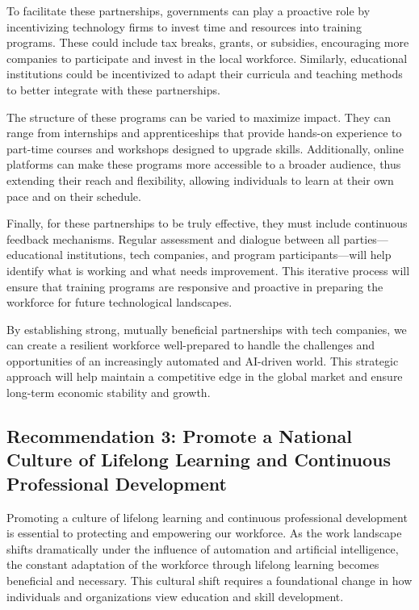 \documentclass[11pt]{article}
\begin{document}
To facilitate these partnerships, governments can play a proactive role by incentivizing technology firms to invest time and resources into training programs. These could include tax breaks, grants, or subsidies, encouraging more companies to participate and invest in the local workforce. Similarly, educational institutions could be incentivized to adapt their curricula and teaching methods to better integrate with these partnerships.

The structure of these programs can be varied to maximize impact. They can range from internships and apprenticeships that provide hands-on experience to part-time courses and workshops designed to upgrade skills. Additionally, online platforms can make these programs more accessible to a broader audience, thus extending their reach and flexibility, allowing individuals to learn at their own pace and on their schedule.

Finally, for these partnerships to be truly effective, they must include continuous feedback mechanisms. Regular assessment and dialogue between all parties—educational institutions, tech companies, and program participants—will help identify what is working and what needs improvement. This iterative process will ensure that training programs are responsive and proactive in preparing the workforce for future technological landscapes.

By establishing strong, mutually beneficial partnerships with tech companies, we can create a resilient workforce well-prepared to handle the challenges and opportunities of an increasingly automated and AI-driven world. This strategic approach will help maintain a competitive edge in the global market and ensure long-term economic stability and growth.

\subsection{Recommendation 3: Promote a National Culture of Lifelong Learning and Continuous Professional Development}

Promoting a culture of lifelong learning and continuous professional development is essential to protecting and empowering our workforce. As the work landscape shifts dramatically under the influence of automation and artificial intelligence, the constant adaptation of the workforce through lifelong learning becomes beneficial and necessary. This cultural shift requires a foundational change in how individuals and organizations view education and skill development.
\end{document}
